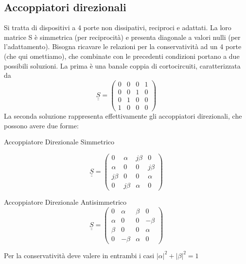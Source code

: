 \subsection{Accoppiatori direzionali}
Si tratta di dispositivi a 4 porte non dissipativi, reciproci e adattati. La loro matrice S è simmetrica (per reciprocità) e presenta diagonale a valori nulli (per l'adattamento).
Bisogna ricavare le relazioni per la conservatività ad un 4 porte (che qui omettiamo), che combinate con le precedenti condizioni portano a due possibili soluzioni. La prima è una banale coppia di cortocircuiti, caratterizzata da
\[\underline{\underline{S}}=
\left(
\begin{array}{cccc}
0& 0& 0& 1\\
0& 0& 1& 0\\
0& 1& 0& 0\\
1& 0& 0& 0
\end{array}
\right)
\]
La seconda soluzione rappresenta effettivamente gli accoppiatori direzionali, che possono avere due forme:

\begin{minipage}{0.5\linewidth}
	Accoppiatore Direzionale Simmetrico
	
	\[
	\underline{\underline{S}}=
	\left(
	\begin{array}{cccc}
	0     & \alpha& j\beta& 0\\
	\alpha& 0     & 0     & j\beta\\
	j\beta& 0     & 0     & \alpha\\
	0     & j\beta& \alpha& 0
	\end{array}
	\right)
	\]
\end{minipage}
\begin{minipage}{0.5\linewidth}
	Accoppiatore Direzionale Antisimmetrico
	\[
	\underline{\underline{S}}=
	\left(
	\begin{array}{cccc}
	0     & \alpha& \beta& 0\\
	\alpha& 0     & 0     & -\beta\\
	\beta& 0     & 0     & \alpha\\
	0     & -\beta& \alpha& 0
	\end{array}
	\right)
	\]
\end{minipage}
\begin{center}
	Per la conservatività deve valere in entrambi i casi $|\alpha|^2+|\beta|^2 = 1$	
\end{center}

